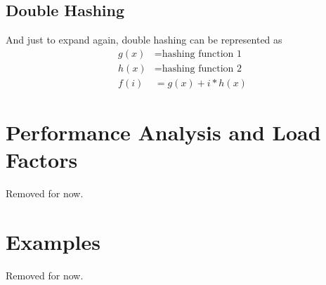 \documentclass[11pt]{book}
\begin{document}
	\subsection{Double Hashing}
		And just to expand again, double hashing can be represented as
		\begin{align}
			g(x) &= \text{hashing function 1} \\
			h(x) &= \text{hashing function 2} \\
			f(i) &= g(x) + i * h(x)
		\end{align}

	\section{Performance Analysis and Load Factors}
		Removed for now.

	\section{Examples}
		Removed for now.
\end{document}
